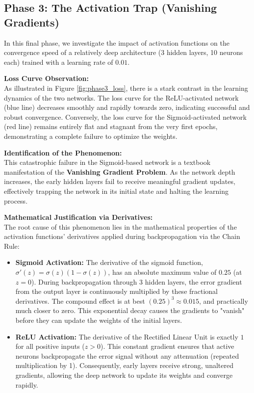 \documentclass{article}
\begin{document}
\subsection{Phase 3: The Activation Trap (Vanishing Gradients)}

In this final phase, we investigate the impact of activation functions on the convergence speed of a relatively deep architecture (3 hidden layers, 10 neurons each) trained with a learning rate of $0.01$.

\textbf{Loss Curve Observation:} \\
As illustrated in Figure \ref{fig:phase3_loss}, there is a stark contrast in the learning dynamics of the two networks. The loss curve for the ReLU-activated network (blue line) decreases smoothly and rapidly towards zero, indicating successful and robust convergence. Conversely, the loss curve for the Sigmoid-activated network (red line) remains entirely flat and stagnant from the very first epochs, demonstrating a complete failure to optimize the weights.

\textbf{Identification of the Phenomenon:} \\
This catastrophic failure in the Sigmoid-based network is a textbook manifestation of the \textbf{Vanishing Gradient Problem}. As the network depth increases, the early hidden layers fail to receive meaningful gradient updates, effectively trapping the network in its initial state and halting the learning process.

\textbf{Mathematical Justification via Derivatives:} \\
The root cause of this phenomenon lies in the mathematical properties of the activation functions' derivatives applied during backpropagation via the Chain Rule:
\begin{itemize}
	\item \textbf{Sigmoid Activation:} The derivative of the sigmoid function, $\sigma'(z) = \sigma(z)(1 - \sigma(z))$, has an absolute maximum value of $0.25$ (at $z=0$). During backpropagation through 3 hidden layers, the error gradient from the output layer is continuously multiplied by these fractional derivatives. The compound effect is at best $(0.25)^3 \approx 0.015$, and practically much closer to zero. This exponential decay causes the gradients to "vanish" before they can update the weights of the initial layers.
	\item \textbf{ReLU Activation:} The derivative of the Rectified Linear Unit is exactly $1$ for all positive inputs ($z > 0$). This constant gradient ensures that active neurons backpropagate the error signal without any attenuation (repeated multiplication by 1). Consequently, early layers receive strong, unaltered gradients, allowing the deep network to update its weights and converge rapidly.
\end{itemize}
\end{document}
